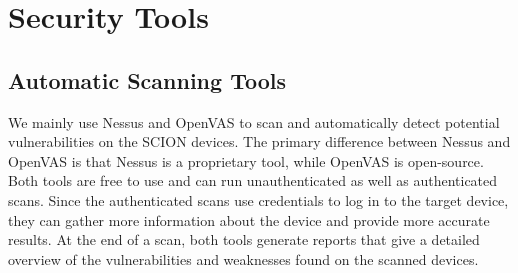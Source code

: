 \section{Security Tools}


\subsection{Automatic Scanning Tools}
We mainly use Nessus and OpenVAS to scan and automatically detect potential vulnerabilities on the SCION devices.
The primary difference between Nessus and OpenVAS is that Nessus is a proprietary tool, while OpenVAS is open-source.
Both tools are free to use and can run unauthenticated as well as authenticated scans.
Since the authenticated scans use credentials to log in to the target device, they can gather more information about the device and provide more accurate results.
At the end of a scan, both tools generate reports that give a detailed overview of the vulnerabilities and weaknesses found on the scanned devices.




